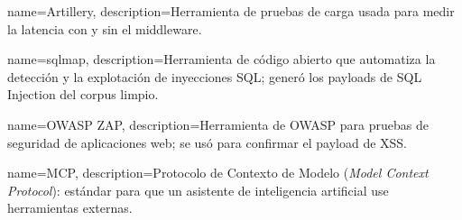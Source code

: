 {
    name={Artillery},
    description={Herramienta de pruebas de carga usada para medir la latencia con y sin el middleware.}
}

{
    name={sqlmap},
    description={Herramienta de código abierto que automatiza la detección y la explotación de inyecciones SQL; generó los payloads de SQL Injection del corpus limpio.}
}

{
    name={OWASP ZAP},
    description={Herramienta de OWASP para pruebas de seguridad de aplicaciones web; se usó para confirmar el payload de XSS.}
}

{
    name={MCP},
    description={Protocolo de Contexto de Modelo (\textit{Model Context Protocol}): estándar para que un asistente de inteligencia artificial use herramientas externas.}
}
